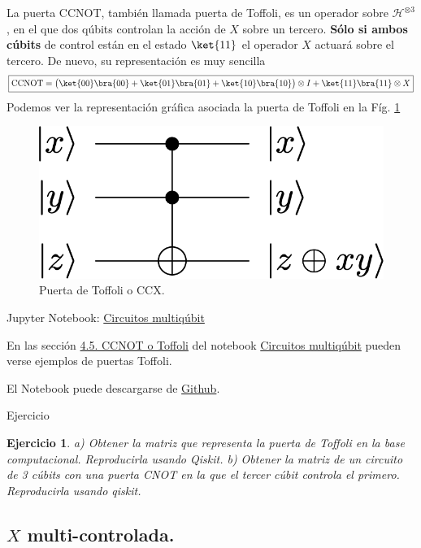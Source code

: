 \documentclass[a4paper,11pt]{book} %
\newtheorem{ejercicio_contador}{Ejercicio}
\newcommand{\Ejercicio}[1]{
		\begin{mybox_gray}{Ejercicio} 
			\begin{ejercicio_contador}
				 #1 
			\end{ejercicio_contador} 
		\end{mybox_gray}
	}
\numberwithin{equation}{chapter}
\begin{document}
La puerta CCNOT, también llamada puerta de Toffoli,  es un operador sobre $\mathcal{H}^{\otimes 3}$, en el que dos qúbits controlan la acción de $X$ sobre un tercero. \textbf{Sólo si ambos cúbits} de control están en el estado $\ket{11}$ el operador $X$ actuará sobre el tercero. De nuevo, su representación es muy sencilla
	\begin{equation}
	\boxed{{\rm CCNOT} = \big(\ket{00}\bra{00}+\ket{01}\bra{01}+\ket{10}\bra{10}\big)\otimes I + \ket{11}\bra{11}\otimes X}
	\end{equation}
Podemos ver la representación gráfica asociada la puerta de Toffoli en la Fíg. \ref{Fig_multiqubit_ccX_gate}
	\begin{figure}[H]
	\centering 
	\includegraphics[width=0.22\linewidth]{Figuras/Fig_multiqubit_ccX_gate.png}
	\caption{Puerta de Toffoli o CCX.}
	\label{Fig_multiqubit_ccX_gate}
	\end{figure}
	
	\begin{mybox_orange}{Jupyter Notebook: \href{https://www.scbi.uma.es/web/wp-content/uploads/Jupyterbook/CICC_UMA/Notebooks/html/docs/Part_01/Chapter_04-Circuitos_Multiqubits_myst.html}{Circuitos multiqúbit}}
	
	En las sección \href{https://www.scbi.uma.es/web/wp-content/uploads/Jupyterbook/CICC_UMA/Notebooks/html/docs/Part_01/Chapter_04-Circuitos_Multiqubits_myst.html#ccnot-o-toffoli}{4.5. CCNOT o Toffoli} del notebook \href{https://www.scbi.uma.es/web/wp-content/uploads/Jupyterbook/CICC_UMA/Notebooks/html/docs/Part_01/Chapter_04-Circuitos_Multiqubits_myst.html}{Circuitos multiqúbit} pueden verse ejemplos de puertas Toffoli.
	
	El Notebook puede descargarse de \href{https://github.com/davidcb98/CICC_UMA/blob/master/Notebooks/Part_01/Chapter_04-Circuitos_Multiqubits.ipynb}{Github}.
	\end{mybox_orange}

	\Ejercicio{
	a) Obtener la matriz que representa la puerta de Toffoli en la base computacional. Reproducirla usando Qiskit. b) Obtener la matriz de un circuito de 3 cúbits con una puerta CNOT en la que el tercer cúbit controla el primero. Reproducirla usando qiskit.
	}
	
		\subsection{$X$ multi-controlada.}
		
\end{document}
